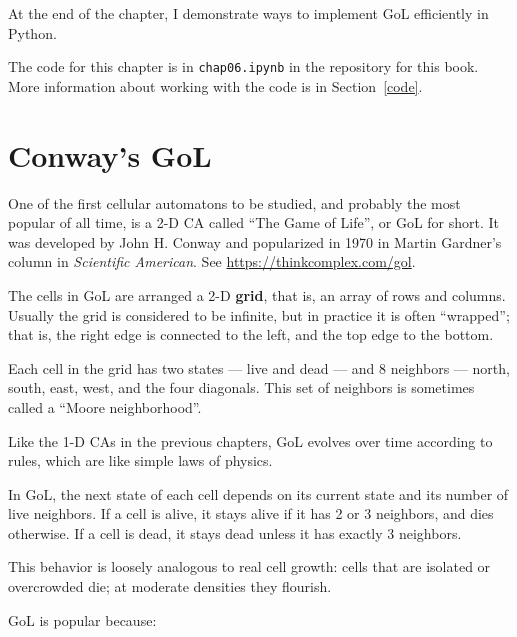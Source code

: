 \documentclass[12pt]{book}
\theoremstyle{exercise}
\begin{document}
At the end of the chapter, I demonstrate ways to implement
GoL efficiently in Python.

The code for this chapter is in {\tt chap06.ipynb} in the repository
for this book.  More information about working with the code is
in Section~\ref{code}.


\section{Conway's GoL}
\label{life}

One of the first cellular automatons to be studied, and probably the
most popular of all time, is a 2-D CA called ``The Game of Life'', or GoL
for short.  It was developed by John H. Conway and popularized in 1970
in Martin Gardner's column in {\em Scientific American}.
See \url{https://thinkcomplex.com/gol}.


The cells in GoL are arranged a 2-D {\bf grid}, that is, an array of rows and columns.  Usually the grid is considered to be infinite, but in practice it is often ``wrapped''; that is, the right edge is connected to the left, and the top edge to the bottom.

Each cell in the grid has two states --- live and dead --- and 8 neighbors --- north, south, east, west, and the four diagonals.  This set of neighbors
is sometimes called a ``Moore neighborhood''.


Like the 1-D CAs in the previous chapters, GoL evolves over time according to rules, which are like simple laws of physics.

In GoL, the next state of each cell depends on its current state and
its number of live neighbors.  If a cell is alive, it stays alive if it
has 2 or 3 neighbors, and dies otherwise.  If a cell is
dead, it stays dead unless it has exactly 3 neighbors.

This behavior is loosely analogous to real cell growth: cells
that are isolated or overcrowded die; at moderate densities they
flourish.

GoL is popular because:
\end{document}

